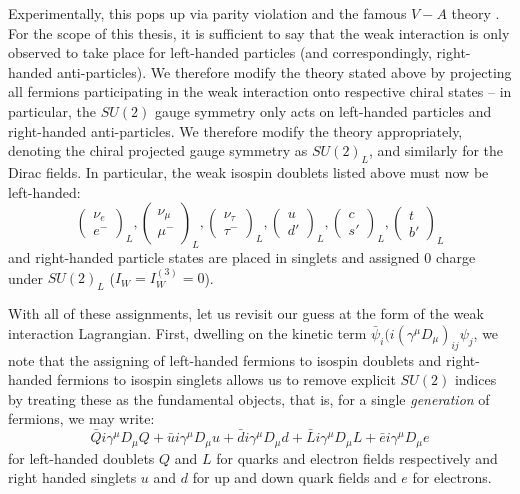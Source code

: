 Experimentally, this pops up via parity violation and the famous $V - A$ theory . 
For the scope of this thesis, it is sufficient to say that the weak interaction is only observed to take
place for left-handed particles (and correspondingly, right-handed anti-particles). We therefore modify the 
theory stated above by projecting all fermions participating in the weak interaction onto respective chiral
states -- in particular, the $SU(2)$ gauge symmetry only acts on left-handed particles and right-handed anti-particles.
We therefore modify the theory appropriately, denoting the chiral projected gauge symmetry as $SU(2)_{L}$, 
and similarly for the Dirac fields. In particular, the weak isospin doublets listed above must now be 
left-handed:
\begin{equation}
\begin{pmatrix}\nu_{e} \\ e^{-}\end{pmatrix}_L, \begin{pmatrix}\nu_{\mu} \\ \mu^{-}\end{pmatrix}_L, 
\begin{pmatrix}\nu_{\tau} \\ \tau^{-}\end{pmatrix}_L, \begin{pmatrix}u \\ d'\end{pmatrix}_L, 
\begin{pmatrix}c \\ s'\end{pmatrix}_L, \begin{pmatrix}t \\ b'\end{pmatrix}_L
\end{equation}
and right-handed particle states are placed in singlets and assigned $0$ charge under $SU(2)_{L}$ ($I_{W} = I_{W}^{(3)}=0$).

With all of these assignments, let us revisit our guess at the form of the weak interaction Lagrangian.
First, dwelling on the kinetic term $\bar{\psi}_{i}(i(\gamma^{\mu}D_{\mu})_{ij}\psi_{j}$, we note that 
the assigning of left-handed fermions to isospin doublets and right-handed fermions to 
isospin singlets allows us to remove explicit $SU(2)$ indices by treating these as the fundamental objects,
that is, for a single \emph{generation} of fermions, we may write:
\begin{equation}
\bar{Q}i\gamma^{\mu}D_{\mu}Q + \bar{u}i\gamma^{\mu}D_{\mu}u +\bar{d}i\gamma^{\mu}D_{\mu}d +\bar{L}i\gamma^{\mu}D_{\mu}L +\bar{e}i\gamma^{\mu}D_{\mu}e
\end{equation}
for left-handed doublets $Q$ and $L$ for quarks and electron fields respectively and right handed singlets 
$u$ and $d$ for up and down quark fields and $e$ for electrons.

